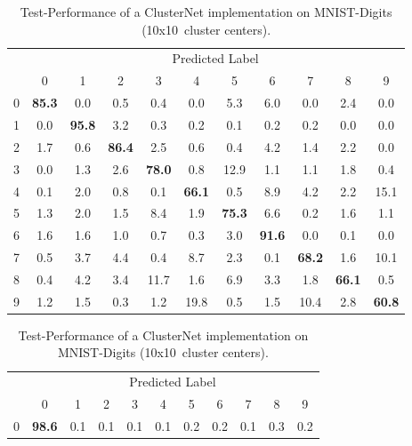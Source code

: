 \documentclass{article}
\begin{document}
\vspace{-3mm}
\begin{table}[hbt!]
    \caption{Test-Performance of a ClusterNet implementation on MNIST-Digits (10x10~cluster centers).} \label{tab:imageclass}
    \begin{subtable}{0.5\linewidth}
        \centering
        \scriptsize
        \tabcolsep=0.10cm
        \begin{tabular}{c|c c c c c c c c c c |}
            & \multicolumn{10}{c}{Predicted Label} \\
            & 0 & 1 & 2 & 3 & 4 & 5 & 6 & 7 & 8 & 9 \\ 
          \hline
            0 & \textbf{85.3} & 0.0 & 0.5 & 0.4 & 0.0 & 5.3 & 6.0 & 0.0 & 2.4 & 0.0 \\
            1 & 0.0 & \textbf{95.8} & 3.2 & 0.3 & 0.2 & 0.1 & 0.2 & 0.2 & 0.0 & 0.0 \\
            2 & 1.7 & 0.6 & \textbf{86.4} & 2.5 & 0.6 & 0.4 & 4.2 & 1.4 & 2.2 & 0.0 \\
            3 & 0.0 & 1.3 & 2.6 & \textbf{78.0} & 0.8 & 12.9 & 1.1 & 1.1 & 1.8 & 0.4 \\
            4 & 0.1 & 2.0 & 0.8 & 0.1 & \textbf{66.1} & 0.5 & 8.9 & 4.2 & 2.2 & 15.1 \\
            5 & 1.3 & 2.0 & 1.5 & 8.4 & 1.9 & \textbf{75.3} & 6.6 & 0.2 & 1.6 & 1.1 \\
            6 & 1.6 & 1.6 & 1.0 & 0.7 & 0.3 & 3.0 & \textbf{91.6} & 0.0 & 0.1 & 0.0 \\
            7 & 0.5 & 3.7 & 4.4 & 0.4 & 8.7 & 2.3 & 0.1 & \textbf{68.2} & 1.6 & 10.1 \\
            8 & 0.4 & 4.2 & 3.4 & 11.7 & 1.6 & 6.9 & 3.3 & 1.8 & \textbf{66.1} & 0.5 \\
            9 & 1.2 & 1.5 & 0.3 & 1.2 & 19.8 & 0.5 & 1.5 & 10.4 & 2.8 & \textbf{60.8}
        \end{tabular}
         \label{tab:mnist1}
  \end{subtable}
  \begin{subtable}{0.5\linewidth}
        \centering
        \scriptsize
        \tabcolsep=0.10cm
        \begin{tabular}{c| c c c c c c c c c c |}
            & \multicolumn{10}{c}{Predicted Label} \\
            & 0 & 1 & 2 & 3 & 4 & 5 & 6 & 7 & 8 & 9 \\ 
          \hline
            0 & \textbf{98.6} & 0.1 & 0.1 & 0.1 & 0.1 & 0.2 & 0.2 & 0.1 & 0.3 & 0.2 \\

\end{tabular}
\end{subtable}
\end{table}
\end{document}
